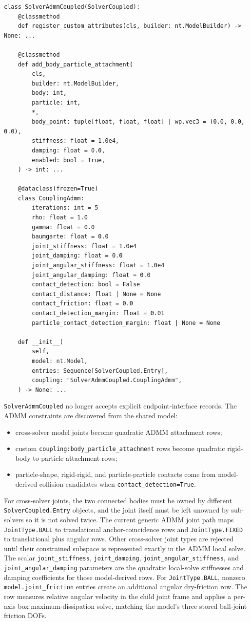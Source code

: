 \documentclass[11pt]{article}
\begin{document}
\begin{verbatim}
class SolverAdmmCoupled(SolverCoupled):
    @classmethod
    def register_custom_attributes(cls, builder: nt.ModelBuilder) -> None: ...

    @classmethod
    def add_body_particle_attachment(
        cls,
        builder: nt.ModelBuilder,
        body: int,
        particle: int,
        *,
        body_point: tuple[float, float, float] | wp.vec3 = (0.0, 0.0, 0.0),
        stiffness: float = 1.0e4,
        damping: float = 0.0,
        enabled: bool = True,
    ) -> int: ...

    @dataclass(frozen=True)
    class CouplingAdmm:
        iterations: int = 5
        rho: float = 1.0
        gamma: float = 0.0
        baumgarte: float = 0.0
        joint_stiffness: float = 1.0e4
        joint_damping: float = 0.0
        joint_angular_stiffness: float = 1.0e4
        joint_angular_damping: float = 0.0
        contact_detection: bool = False
        contact_distance: float | None = None
        contact_friction: float = 0.0
        contact_detection_margin: float = 0.01
        particle_contact_detection_margin: float | None = None

    def __init__(
        self,
        model: nt.Model,
        entries: Sequence[SolverCoupled.Entry],
        coupling: "SolverAdmmCoupled.CouplingAdmm",
    ) -> None: ...
\end{verbatim}

\texttt{SolverAdmmCoupled} no longer accepts explicit endpoint-interface
records. The ADMM constraints are discovered from the shared model:
\begin{itemize}
    \item cross-solver model joints become quadratic ADMM attachment rows;
    \item custom \texttt{coupling:body\_particle\_attachment} rows become
    quadratic rigid-body to particle attachment rows;
    \item particle-shape, rigid-rigid, and particle-particle contacts come from
    model-derived collision candidates when \texttt{contact\_detection=True}.
\end{itemize}

For cross-solver joints, the two connected bodies must be owned by different
\texttt{SolverCoupled.Entry} objects, and the joint itself must be left unowned
by sub-solvers so it is not solved twice. The current generic ADMM joint path
maps \texttt{JointType.BALL} to translational anchor-coincidence rows and
\texttt{JointType.FIXED} to translational plus angular rows. Other cross-solver
joint types are rejected until their constrained subspace is represented
exactly in the ADMM local solve. The scalar \texttt{joint\_stiffness},
\texttt{joint\_damping}, \texttt{joint\_angular\_stiffness}, and
\texttt{joint\_angular\_damping} parameters are the quadratic local-solve
stiffnesses and damping coefficients for those model-derived rows.
For \texttt{JointType.BALL}, nonzero \texttt{model.joint\_friction} entries
create an additional angular dry-friction row.  The row measures relative
angular velocity in the child joint frame and applies a per-axis box
maximum-dissipation solve, matching the model's three stored ball-joint
friction DOFs.
\end{document}

